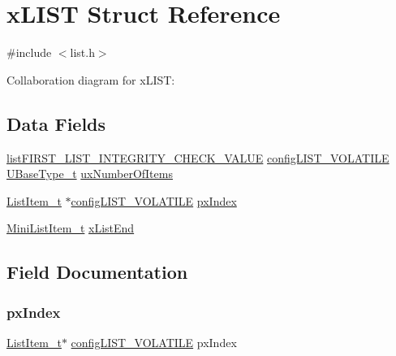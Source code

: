 \hypertarget{structx_l_i_s_t}{}\section{x\+L\+I\+ST Struct Reference}
\label{structx_l_i_s_t}


{\ttfamily \#include $<$list.\+h$>$}



Collaboration diagram for x\+L\+I\+ST\+:
\subsection*{Data Fields}
\begin{DoxyCompactItemize}
\item 
\hyperlink{list_8h_a3a52b5a4f70d3a07e37a5814a23ba880}{list\+F\+I\+R\+S\+T\+\_\+\+L\+I\+S\+T\+\_\+\+I\+N\+T\+E\+G\+R\+I\+T\+Y\+\_\+\+C\+H\+E\+C\+K\+\_\+\+V\+A\+L\+UE} \hyperlink{list_8h_a2d5de557c5561c8980d1bf51d87d8cba}{config\+L\+I\+S\+T\+\_\+\+V\+O\+L\+A\+T\+I\+LE} \hyperlink{portmacro_8h_a646f89d4298e4f5afd522202b11cb2e6}{U\+Base\+Type\+\_\+t} \hyperlink{structx_l_i_s_t_a17b9828dd40520fcda9127b4cb4c0c0c}{ux\+Number\+Of\+Items}
\item 
\hyperlink{list_8h_a1a62d469392f9bfe2443e7efab9c8398}{List\+Item\+\_\+t} $\ast$\hyperlink{list_8h_a2d5de557c5561c8980d1bf51d87d8cba}{config\+L\+I\+S\+T\+\_\+\+V\+O\+L\+A\+T\+I\+LE} \hyperlink{structx_l_i_s_t_ae8639154918acc3f75d718480322aa82}{px\+Index}
\item 
\hyperlink{list_8h_a542a8d55e98bc407593979e61f83cd02}{Mini\+List\+Item\+\_\+t} \hyperlink{structx_l_i_s_t_a83a65be4e3a2bb70855742896126bf63}{x\+List\+End}
\end{DoxyCompactItemize}


\subsection{Field Documentation}
\mbox{\label{structx_l_i_s_t_ae8639154918acc3f75d718480322aa82}} 
\subsubsection{\texorpdfstring{px\+Index}{pxIndex}}
{\footnotesize\ttfamily \hyperlink{list_8h_a1a62d469392f9bfe2443e7efab9c8398}{List\+Item\+\_\+t}$\ast$ \hyperlink{list_8h_a2d5de557c5561c8980d1bf51d87d8cba}{config\+L\+I\+S\+T\+\_\+\+V\+O\+L\+A\+T\+I\+LE} px\+Index}

